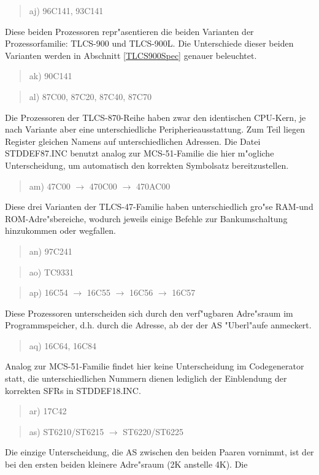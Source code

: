 \documentclass[12pt,a4paper,twoside]{report}
\begin{document}
{\begin{quote}
aj) 96C141, 93C141
\end{quote}
Diese beiden Prozessoren repr"asentieren die beiden Varianten der
Prozessorfamilie: TLCS-900 und TLCS-900L.  Die Unterschiede dieser beiden
Varianten werden in Abschnitt \ref{TLCS900Spec} genauer beleuchtet.
\begin{quote}
ak) 90C141
\end{quote}
\begin{quote}
al) 87C00, 87C20, 87C40, 87C70
\end{quote}
Die Prozessoren der TLCS-870-Reihe haben zwar den identischen CPU-Kern, je
nach Variante aber eine unterschiedliche Peripherieausstattung.  Zum
Teil liegen Register gleichen Namens auf unterschiedlichen Adressen.
Die Datei STDDEF87.INC benutzt analog zur MCS-51-Familie die hier
m"ogliche Unterscheidung, um automatisch den korrekten Symbolsatz
bereitzustellen.
\begin{quote}
am) 47C00 $\rightarrow$ 470C00 $\rightarrow$ 470AC00
\end{quote}
Diese drei Varianten der TLCS-47-Familie haben unterschiedlich gro"se
RAM-und ROM-Adre"sbereiche, wodurch jeweils einige Befehle zur
Bankumschaltung hinzukommen oder wegfallen.
\begin{quote}
an) 97C241
\end{quote}
\begin{quote}
ao) TC9331
\end{quote}
\begin{quote}
ap) 16C54 $\rightarrow$ 16C55 $\rightarrow$ 16C56 $\rightarrow$ 16C57
\end{quote}
Diese Prozessoren unterscheiden sich durch den verf"ugbaren
Adre"sraum im Programmspeicher, d.h. durch die Adresse, ab der
der AS "Uberl"aufe anmeckert.
\begin{quote}
aq) 16C64, 16C84
\end{quote}
Analog zur MCS-51-Familie findet hier keine Unterscheidung im
Codegenerator statt, die unterschiedlichen Nummern dienen lediglich
der Einblendung der korrekten SFRs in STDDEF18.INC.
\begin{quote}
ar) 17C42
\end{quote}
\begin{quote}
as) ST6210/ST6215 $\rightarrow$ ST6220/ST6225
\end{quote}
Die einzige Unterscheidung, die AS zwischen den beiden Paaren vornimmt, ist
der bei den ersten beiden kleinere Adre"sraum (2K anstelle 4K).  Die
}
\end{document}
